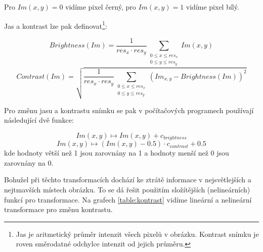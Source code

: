 Pro $ Im(x,y) = 0 $ vidíme pixel černý, pro $ Im(x,y) = 1 $ vidíme pixel bílý.

Jas a kontrast lze pak definovat\footnote{Jas je aritmetický průměr intenzit všech pixelů v obrázku. Kontrast snímku je roven směrodatné odchylce intenzit od jejich průměru.}\cite{wikipediaContrast}:

\begin{equation}
Brightness(Im) = \frac{1}{res_{x} \cdot res_{y}}\sum_{\substack{0 \leq x \leq res_{x} \\ 0 \leq y \leq res_{y}}} Im(x,y)
\end{equation}
\begin{equation}
Contrast(Im) = \sqrt{\frac{1}{res_{x} \cdot res_{y}}\sum_{\substack{ 0 \leq x \leq res_{x} \\ 0 \leq y \leq res_{y} }}(Im_{x,y}-Brightness(Im))^2}
\end{equation}

Pro změnu jasu a kontrastu snímku se pak v počítačových programech používají následující dvě funkce:

\begin{equation} Im(x,y) \longmapsto Im(x,y) + c_{brightness} \end{equation}
\begin{equation} Im(x,y) \longmapsto   (Im(x,y) - 0.5) \cdot c_{contrast} + 0.5 \end{equation}
\indent kde hodnoty větší než 1 jsou zarovnány na 1 a hodnoty menší než 0 jsou zarovnány na 0.

Bohužel při těchto transformacích dochází ke ztrátě informace v nejsvětlejších a nejtmavších místech obrázku. To se dá řešit použitím složítějších (nelineárních) funkcí pro transformace. Na grafech \ref{table:kontrast} vidíme lineární a nelineární transformace pro změnu kontrastu.

